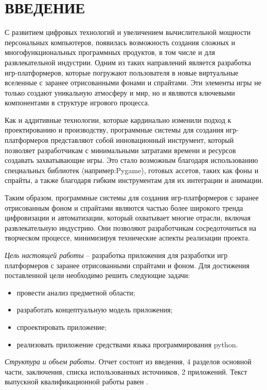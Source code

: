 \section*{ВВЕДЕНИЕ}

С развитием цифровых технологий и увеличением вычислительной мощности персональных компьютеров, появилась возможность создания сложных и многофункциональных программных продуктов, в том числе и для развлекательной индустрии. Одним из таких направлений является разработка игр-платформеров, которые погружают пользователя в новые виртуальные вселенные с заранее отрисованными фонами и спрайтами. Эти элементы игры не только создают уникальную атмосферу и мир, но и являются ключевыми компонентами в структуре игрового процесса.

Как и аддитивные технологии, которые кардинально изменили подход к проектированию и производству, программные системы для создания игр-платформеров представляют собой инновационный инструмент, который позволяет разработчикам с минимальными затратами времени и ресурсов создавать захватывающие игры. Это стало возможным благодаря использованию специальных библиотек (например:Pygame), готовых ассетов, таких как фоны и спрайты, а также благодаря гибким инструментам для их интеграции и анимации.

Таким образом, программные системы для создания игр-платформеров с заранее отрисованным фоном и спрайтами являются частью более широкого тренда цифровизации и автоматизации, который охватывает многие отрасли, включая развлекательную индустрию. Они позволяют разработчикам сосредоточиться на творческом процессе, минимизируя технические аспекты реализации проекта.

\emph{Цель настоящей работы} – разработка приложения для разработки игр платформеров с заранее отрисованными спрайтами и фоном. Для достижения поставленной цели необходимо решить следующие задачи:
\begin{itemize}
	\item провести анализ предметной области;
	\item разработать концептуальную модель приложения;
	\item спроектировать приложение;
	\item реализовать приложение средствами языка программирования python.
\end{itemize}


\emph{Структура и объем работы.} Отчет состоит из введения, 4 разделов основной части, заключения, списка использованных источников, 2 приложений. Текст выпускной квалификационной работы равен .

